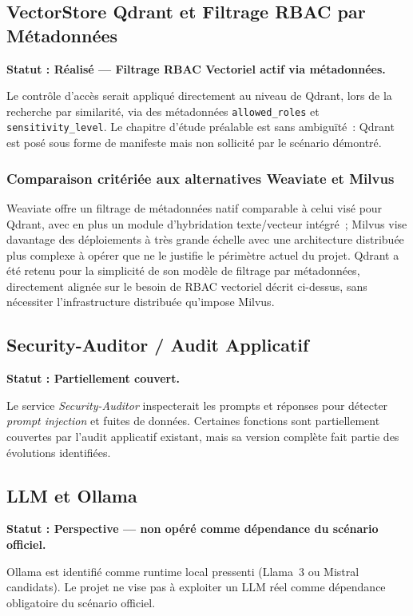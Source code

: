 \subsection{VectorStore Qdrant et Filtrage RBAC par Métadonnées}
\label{sub:vectorstore_qdrant_note}
\textbf{Statut : Réalisé — Filtrage RBAC Vectoriel actif via métadonnées.}

Le contrôle d'accès serait appliqué directement au niveau de Qdrant, lors de la recherche par similarité, via des métadonnées \texttt{allowed\_roles} et \texttt{sensitivity\_level}. Le chapitre d'étude préalable est sans ambiguïté~: Qdrant est posé sous forme de manifeste mais non sollicité par le scénario démontré.

\subsubsection{Comparaison critériée aux alternatives Weaviate et Milvus}
Weaviate offre un filtrage de métadonnées natif comparable à celui visé pour Qdrant, avec en plus un module d'hybridation texte/vecteur intégré~; Milvus vise davantage des déploiements à très grande échelle avec une architecture distribuée plus complexe à opérer que ne le justifie le périmètre actuel du projet. Qdrant a été retenu pour la simplicité de son modèle de filtrage par métadonnées, directement alignée sur le besoin de RBAC vectoriel décrit ci-dessus, sans nécessiter l'infrastructure distribuée qu'impose Milvus.

\subsection{Security-Auditor / Audit Applicatif}
\textbf{Statut : Partiellement couvert.}

Le service \textit{Security-Auditor} inspecterait les prompts et réponses pour détecter \textit{prompt injection} et fuites de données. Certaines fonctions sont partiellement couvertes par l'audit applicatif existant, mais sa version complète fait partie des évolutions identifiées. %

\subsection{LLM et Ollama}
\textbf{Statut : Perspective — non opéré comme dépendance du scénario officiel.}

Ollama est identifié comme runtime local pressenti (Llama~3 ou Mistral candidats). Le projet ne vise pas à exploiter un LLM réel comme dépendance obligatoire du scénario officiel.

